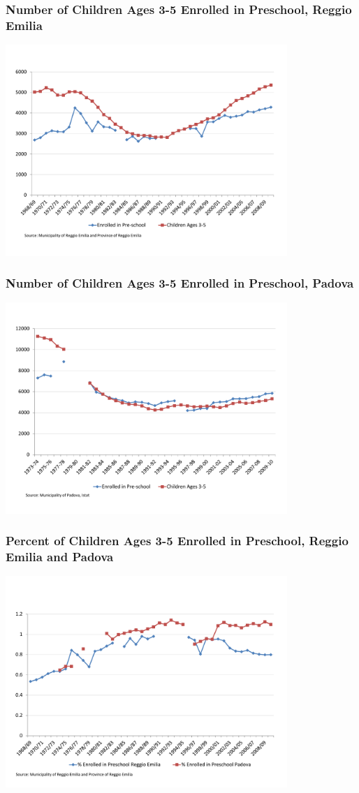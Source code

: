 \documentclass[dynamic]{JJH-Beamer}
\begin{document}
\begin{frame}
\frametitle{Number of Children Ages 3-5 Enrolled in Preschool, Reggio Emilia}
\centering
\includegraphics[width=0.8\textwidth]{../../output/image/Enrollement_Preschool_RE.pdf}
\end{frame}

\begin{frame}
\frametitle{Number of Children Ages 3-5 Enrolled in Preschool, Padova}
\centering
\includegraphics[width=0.8\textwidth]{../../output/image/Enrollement_Preschool_Padova.pdf}
\end{frame}

\begin{frame}
\frametitle{Percent of Children Ages 3-5 Enrolled in Preschool, Reggio Emilia and Padova}
\centering
\includegraphics[width=0.8\textwidth]{../../output/image/Enrollement_Preschool_age3-5.pdf}
\end{frame}
\end{document}
